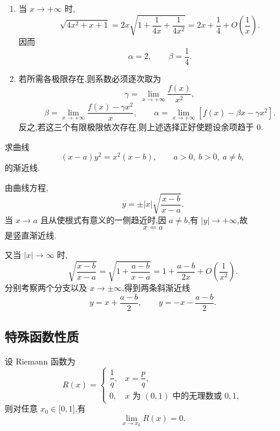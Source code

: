 \begin{solution}
    \begin{enumerate}
        \item 当 $x\to+\infty$ 时,
              \[
                  \sqrt{4x^2+x+1}
                  =2x\sqrt{1+\dfrac{1}{4x}+\dfrac{1}{4x^2}}
                  =2x+\dfrac{1}{4}+O\left(\dfrac{1}{x}\right).
              \]
              因而
              \[
                  \alpha=2,
                  \qquad
                  \beta=\dfrac{1}{4}.
              \]
        \item 若所需各极限存在,则系数必须逐次取为
              \[
                  \gamma=\lim\limits_{x\to+\infty}\dfrac{f(x)}{x^2},
              \]
              \[
                  \beta=\lim\limits_{x\to+\infty}
                  \dfrac{f(x)-\gamma x^2}{x},
                  \qquad
                  \alpha=\lim\limits_{x\to+\infty}
                  \left[f(x)-\beta x-\gamma x^2\right].
              \]
              反之,若这三个有限极限依次存在,则上述选择正好使题设余项趋于 $0$.
    \end{enumerate}
\end{solution}

\begin{example}
    求曲线
    \[
        (x-a)y^2=x^2(x-b),
        \qquad a>0,\ b>0,\ a\neq b,
    \]
    的渐近线.
\end{example}
\exampleblank

\begin{solution}
    由曲线方程,
    \[
        y=\pm |x|\sqrt{\dfrac{x-b}{x-a}}.
    \]
    当 $x\to a$ 且从使根式有意义的一侧趋近时,因 $a\neq b$,有 $|y|\to+\infty$,故
    \[
        x=a
    \]
    是竖直渐近线.

    又当 $|x|\to\infty$ 时,
    \[
        \sqrt{\dfrac{x-b}{x-a}}
        =\sqrt{1+\dfrac{a-b}{x-a}}
        =1+\dfrac{a-b}{2x}+O\left(\dfrac{1}{x^2}\right).
    \]
    分别考察两个分支以及 $x\to\pm\infty$,得到两条斜渐近线
    \[
        y=x+\dfrac{a-b}{2},
        \qquad
        y=-x-\dfrac{a-b}{2}.
    \]
\end{solution}



\subsection{特殊函数性质}

\begin{proposition}
    设 Riemann 函数为
    \[
        R(x)=
        \begin{cases}
            \dfrac{1}{q}, & x=\dfrac{p}{q},                     \\
            0,            & x\text{ 为 }(0,1)\text{ 中的无理数或 }0,1,
        \end{cases}
    \]
    则对任意 $x_0\in\lbrack 0,1\rbrack$,有
    \[
        \lim\limits_{x\to x_0}R(x)=0.
    \]
\end{proposition}

